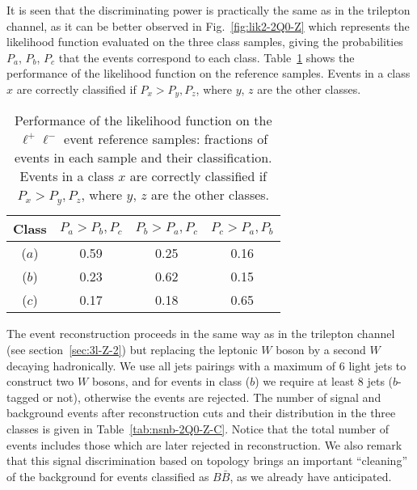 \documentclass[12pt,a4paper]{article}
\newcommand{\BB}{B \bar B}
\begin{document}
%
It is seen that the 
discriminating power is practically the same as in the trilepton channel, as it can be better observed in Fig.~\ref{fig:lik2-2Q0-Z} which represents the likelihood function evaluated on the three class samples, giving the probabilities $P_a$, $P_b$, $P_c$ that the events correspond to each class.
Table~\ref{tab:lik-2Q0-Z} shows the performance of the likelihood function on the reference samples.
Events in a class $x$ are correctly classified if $P_x > P_y,P_z$, where $y$, $z$ are the other classes. 


\begin{table}[htb]
\begin{center}
\begin{tabular}{cccc}
Class & $P_a > P_b,P_c$ & $P_b > P_a,P_c$ & $P_c > P_a,P_b$ \\
\hline
($a$) & 0.59 & 0.25 & 0.16 \\
($b$) & 0.23 & 0.62 & 0.15 \\
($c$) & 0.17 & 0.18 & 0.65
\end{tabular}
\end{center}
\caption{Performance of the likelihood function on the $\ell^+ \ell^-$ event reference samples: fractions of events in each sample and their classification. Events in a class $x$ are correctly classified if $P_x > P_y,P_z$, where $y$, $z$ are the other classes.}
\label{tab:lik-2Q0-Z}
\end{table}

The event reconstruction proceeds in the same way as in the trilepton channel (see section~\ref{sec:3l-Z-2}) but replacing the leptonic $W$ boson by a second $W$ decaying hadronically. We use all jets pairings with a maximum of 6 light jets to construct two $W$ bosons, and for events in class ($b$) we require at least 8 jets ($b$-tagged or not), otherwise the events are rejected.
The number of signal and background events after reconstruction cuts and their distribution in the three classes is given in Table~\ref{tab:nsnb-2Q0-Z-C}. Notice that the total number of events includes those which are later rejected in reconstruction. We also remark that this signal discrimination based on topology brings an important ``cleaning'' of the background for events classified as $\BB$, as we already have anticipated.
\end{document}
